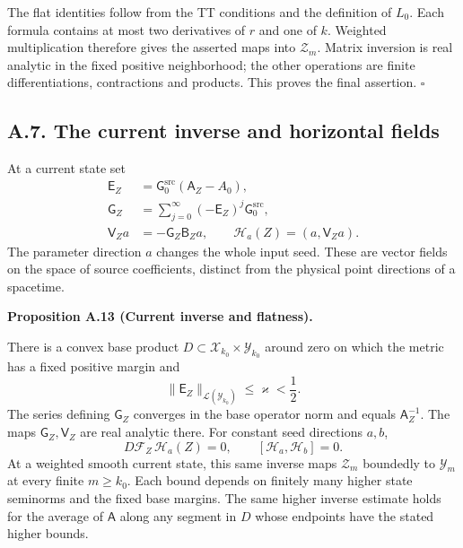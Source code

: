 \documentclass[
  english,
  11pt,
  reqno]{amsart}
\makeatletter
\newcommand{\pandocstatementheading}[1]{%
  \par\if@nobreak\else
    \addpenalty{\@beginparpenalty}%
    \addvspace{.5\baselineskip plus .2\baselineskip minus .2\baselineskip}%
  \fi
  {\normalfont\bfseries #1\par}%
  \nobreak\@afterindenttrue\@afterheading
}
\makeatother
\begin{document}
The flat identities follow from the TT conditions and the definition of
\(L_0\). Each formula contains at most two derivatives of \(r\) and one
of \(k\). Weighted multiplication therefore gives the asserted maps into
\(\mathcal Z_m\). Matrix inversion is real analytic in the fixed
positive neighborhood; the other operations are finite differentiations,
contractions and products. This proves the final assertion.
\hfill\(\square\)

\subsection{A.7. The current inverse and horizontal
fields}\label{a.7.-the-current-inverse-and-horizontal-fields}\label{sec:online-current-inverse-and-flatness}

At a current state set%
 \[
\begin{aligned}
\mathsf E_Z&=\mathsf G_0^{\mathrm{src}}(\mathsf A_Z-A_0),\\
\mathsf G_Z&=\sum_{j=0}^{\infty}(-\mathsf E_Z)^j\mathsf G_0^{\mathrm{src}},\\
\mathsf V_Za&=-\mathsf G_Z\mathsf B_Za,\qquad
\mathscr H_a(Z)=(a,\mathsf V_Za).
\end{aligned}
\] The parameter direction \(a\) changes the whole input seed. These are
vector fields on the space of source coefficients, distinct from the
physical point directions of a spacetime.

\pandocstatementheading{\leavevmode{}\label{prop:online-current-inverse-horizontal-flatness}Proposition A.13 (Current inverse and flatness).}

There is a convex base product
\(D\subset\mathcal X_{k_0}\times\mathcal Y_{k_0}\) around zero on which
the metric has a fixed positive margin and%
 \[
\|\mathsf E_Z\|_{\mathcal L(\mathcal Y_{k_0})}
\le\varkappa<\frac12.
\] The series defining \(\mathsf G_Z\) converges in the base operator
norm and equals \(\mathsf A_Z^{-1}\). The maps
\(\mathsf G_Z,\mathsf V_Z\) are real analytic there. For constant seed
directions \(a,b\),%
\[
D\mathcal F_Z\,\mathscr H_a(Z)=0,\qquad
[\mathscr H_a,\mathscr H_b]=0.
\] At a weighted smooth current state, this same inverse maps
\(\mathcal Z_m\) boundedly to \(\mathcal Y_m\) at every finite
\(m\ge k_0\). Each bound depends on finitely many higher state seminorms
and the fixed base margins. The same higher inverse estimate holds for
the average of \(\mathsf A\) along any segment in \(D\) whose endpoints
have the stated higher bounds.
\end{document}
